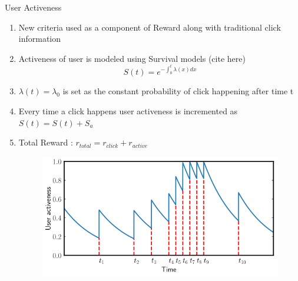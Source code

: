 \begin{frame}{User Activeness}
    \begin{enumerate}
        \item New criteria used as a component of Reward along with traditional click information
        \item Activeness of user is modeled using Survival models (cite here)
        \begin{equation}
            S(t) = e^{- \int_0^t \lambda(x)dx}
        \end{equation}
        \item $\lambda(t) = \lambda_0$ is set as the constant probability of click happening after time t
        \item Every time a click happens user activeness is incremented as $S(t) = S(t) + S_a$
        \item Total Reward : $r_{total} = r_{click} + r_{active}$
        \begin{figure}
            \centering
            \includegraphics[scale=0.3]{DeepinScreenshot_select-area_20200514225125.png}
            \label{fig:user_activeness}
        \end{figure}
    \end{enumerate}
\end{frame}



